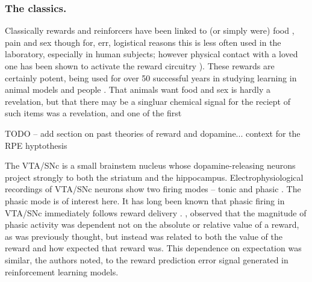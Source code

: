 \documentclass[doc,12pt]{apa}        %
\begin{document}
\subsubsection{The classics.} %
\label{sub:the_classics}
Classically rewards and reinforcers have been linked to (or simply were) food \cite{ODoherty:2006p2875}, pain \cite{Becerra:2011p7581,schultz:2007aa} and sex though for, err, logistical reasons this is less often used in the laboratory, especially in human subjects; however physical contact with a loved one has been shown to activate the reward circuitry \cite{Izuma:2008p2822,Fliessbach:2007gf}).  These rewards are certainly potent, being used for over 50 successful years in studying learning in animal models \cite{iversen:2007aa} and people \cite{Kim:2010p7248,Montague:2006mz}.  That animals want food and sex is hardly a revelation, but that there may be a singluar chemical signal for the reciept of such items was a revelation, and one of the first  

TODO -- add section on past theories of reward and dopamine... context for the RPE hyptothesis


The VTA/SNc is a small brainstem nucleus whose dopamine-releasing neurons project strongly to both the striatum and the hippocampus.  Electrophysiological recordings of VTA/SNc neurons show two firing modes -- tonic and phasic \cite{DawNW:2006p6343}.  The phasic mode is of interest here.  It has long been known that phasic firing in VTA/SNc immediately follows reward delivery \cite{iversen:2007aa}. , observed that the magnitude of phasic activity was dependent not on the absolute or relative value of a reward, as was previously thought, but instead was related to both the value of the reward and how expected that reward was.  This dependence on expectation was similar, the authors noted, to the reward prediction error signal generated in reinforcement learning models.  
\end{document}
